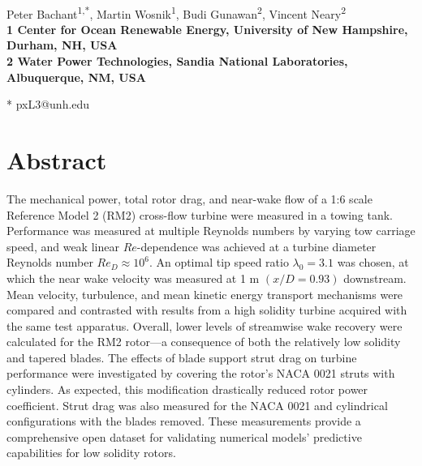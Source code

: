 \documentclass[10pt,letterpaper]{article}
\date{}
\begin{document}
\vspace*{0.35in}

\begin{flushleft}

{\Large \textbf{}}
\newline
\\
Peter Bachant\textsuperscript{1,*},
Martin Wosnik\textsuperscript{1},
Budi Gunawan\textsuperscript{2},
Vincent Neary\textsuperscript{2}
\\
\bigskip
\bf{1} Center for Ocean Renewable Energy, University of New Hampshire, Durham, NH,
USA
\\
\bf{2} Water Power Technologies, Sandia National Laboratories, Albuquerque, NM, USA
\\
\bigskip

* pxL3@unh.edu

\end{flushleft}

\section*{Abstract}

The mechanical power, total rotor drag, and near-wake flow of a 1:6 scale
Reference Model 2 (RM2) cross-flow turbine were measured in a towing tank.
Performance was measured at multiple Reynolds numbers by varying tow carriage
speed, and weak linear $Re$-dependence was achieved at a turbine diameter
Reynolds number $Re_D \approx 10^6$. An optimal tip speed ratio $\lambda_0 =
3.1$ was chosen, at which the near wake velocity was measured at 1 m
$(x/D=0.93)$ downstream. Mean velocity, turbulence, and mean kinetic energy
transport mechanisms were compared and contrasted with results from a high
solidity turbine acquired with the same test apparatus. Overall, lower levels of
streamwise wake recovery were calculated for the RM2 rotor---a consequence of
both the relatively low solidity and tapered blades. The effects of blade
support strut drag on turbine performance were investigated by covering the
rotor's NACA 0021 struts with cylinders. As expected, this modification
drastically reduced rotor power coefficient. Strut drag was also measured for
the NACA 0021 and cylindrical configurations with the blades removed. These
measurements provide a comprehensive open dataset for validating numerical
models' predictive capabilities for low solidity rotors.
\end{document}
